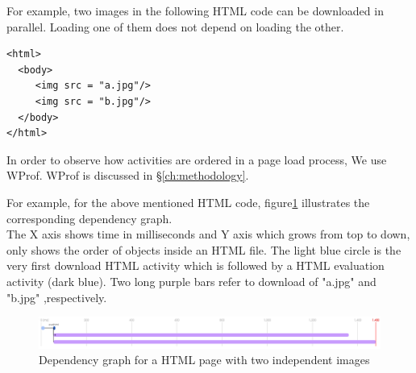 \noindent For example, two images in the following HTML code can be downloaded in parallel. Loading one of them does not depend on loading the other.\\ 


\begin{verbatim}
<html>
  <body>
     <img src = "a.jpg"/>
     <img src = "b.jpg"/>
  </body>
</html>
\end{verbatim}

\noindent In order to observe how activities are ordered in a page load process, We use WProf\cite{wprof}. WProf is discussed in \S\ref{ch:methodology}.


\noindent For example, for the above mentioned HTML code, figure\ref{fig:twoimages} illustrates the corresponding dependency graph.\\
The X axis shows time in milliseconds and Y axis which grows from top to down, only  shows the order of objects inside an HTML file.
The light blue circle is the very first download HTML activity which is followed by a HTML evaluation activity (dark blue).
Two long purple bars refer to download of "a.jpg" and "b.jpg" ,respectively. 

 \begin{figure}[!htb]
  \centering
    \includegraphics[width=0.85 \textwidth]{./figures/introduction/twoimages.pdf}
  \caption {Dependency graph for a HTML page with two independent images}
  \label{fig:twoimages}
\end{figure}

